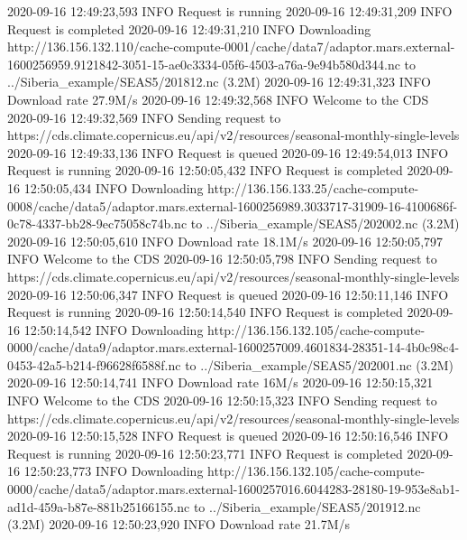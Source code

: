 \documentclass[letterpaper,10pt,english]{sphinxmanual}
\begin{document}
{\begin{sphinxVerbatim}[commandchars=\\\{\}]
2020-09-16 12:49:23,593 INFO Request is running
2020-09-16 12:49:31,209 INFO Request is completed
2020-09-16 12:49:31,210 INFO Downloading http://136.156.132.110/cache-compute-0001/cache/data7/adaptor.mars.external-1600256959.9121842-3051-15-ae0c3334-05f6-4503-a76a-9e94b580d344.nc to ../Siberia\_example/SEAS5/201812.nc (3.2M)
2020-09-16 12:49:31,323 INFO Download rate 27.9M/s
2020-09-16 12:49:32,568 INFO Welcome to the CDS
2020-09-16 12:49:32,569 INFO Sending request to https://cds.climate.copernicus.eu/api/v2/resources/seasonal-monthly-single-levels
2020-09-16 12:49:33,136 INFO Request is queued
2020-09-16 12:49:54,013 INFO Request is running
2020-09-16 12:50:05,432 INFO Request is completed
2020-09-16 12:50:05,434 INFO Downloading http://136.156.133.25/cache-compute-0008/cache/data5/adaptor.mars.external-1600256989.3033717-31909-16-4100686f-0c78-4337-bb28-9ec75058c74b.nc to ../Siberia\_example/SEAS5/202002.nc (3.2M)
2020-09-16 12:50:05,610 INFO Download rate 18.1M/s
2020-09-16 12:50:05,797 INFO Welcome to the CDS
2020-09-16 12:50:05,798 INFO Sending request to https://cds.climate.copernicus.eu/api/v2/resources/seasonal-monthly-single-levels
2020-09-16 12:50:06,347 INFO Request is queued
2020-09-16 12:50:11,146 INFO Request is running
2020-09-16 12:50:14,540 INFO Request is completed
2020-09-16 12:50:14,542 INFO Downloading http://136.156.132.105/cache-compute-0000/cache/data9/adaptor.mars.external-1600257009.4601834-28351-14-4b0c98c4-0453-42a5-b214-f96628f6588f.nc to ../Siberia\_example/SEAS5/202001.nc (3.2M)
2020-09-16 12:50:14,741 INFO Download rate 16M/s
2020-09-16 12:50:15,321 INFO Welcome to the CDS
2020-09-16 12:50:15,323 INFO Sending request to https://cds.climate.copernicus.eu/api/v2/resources/seasonal-monthly-single-levels
2020-09-16 12:50:15,528 INFO Request is queued
2020-09-16 12:50:16,546 INFO Request is running
2020-09-16 12:50:23,771 INFO Request is completed
2020-09-16 12:50:23,773 INFO Downloading http://136.156.132.105/cache-compute-0000/cache/data5/adaptor.mars.external-1600257016.6044283-28180-19-953e8ab1-ad1d-459a-b87e-881b25166155.nc to ../Siberia\_example/SEAS5/201912.nc (3.2M)
2020-09-16 12:50:23,920 INFO Download rate 21.7M/s
\end{sphinxVerbatim}
}
\end{document}
